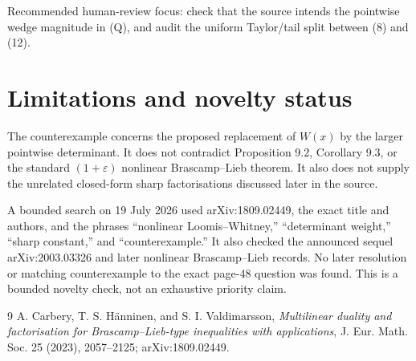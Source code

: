 \documentclass[11pt]{article}
\begin{document}
Recommended human-review focus: check that the source intends the pointwise
wedge magnitude in \textup{(Q)}, and audit the uniform Taylor/tail split
between \textup{(8)} and \textup{(12)}.

\section{Limitations and novelty status}
The counterexample concerns the proposed replacement of $W(x)$ by the larger
pointwise determinant.  It does not contradict Proposition 9.2, Corollary
9.3, or the standard $(1+\varepsilon)$ nonlinear Brascamp--Lieb theorem.  It
also does not supply the unrelated closed-form sharp factorisations discussed
later in the source.

A bounded search on 19 July 2026 used arXiv:1809.02449, the exact title and
authors, and the phrases ``nonlinear Loomis--Whitney,'' ``determinant weight,''
``sharp constant,'' and ``counterexample.''  It also checked the announced
sequel arXiv:2003.03326 and later nonlinear Brascamp--Lieb records.  No later
resolution or matching counterexample to the exact page-48 question was
found.  This is a bounded novelty check, not an exhaustive priority claim.

\begin{thebibliography}{9}
A. Carbery, T. S. H\"anninen, and S. I. Valdimarsson,
\emph{Multilinear duality and factorisation for Brascamp--Lieb-type
inequalities with applications}, J. Eur. Math. Soc. 25 (2023), 2057--2125;
arXiv:1809.02449.
\end{thebibliography}
\end{document}
